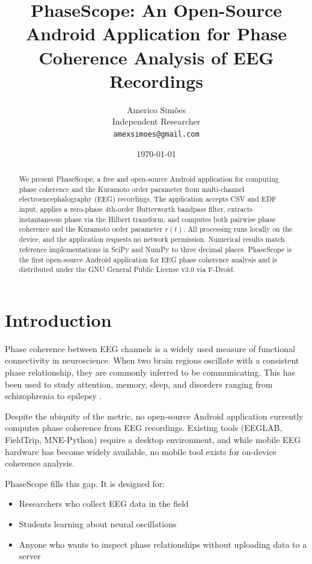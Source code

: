 \documentclass[11pt,a4paper]{article}
\title{\textbf{PhaseScope: An Open-Source Android Application for Phase Coherence Analysis of EEG Recordings}}
\author{Americo Sim\~oes\\ \small Independent Researcher\\ \small \texttt{amexsimoes@gmail.com}}
\date{\today}
\begin{document}
\maketitle

\begin{abstract}
We present PhaseScope, a free and open-source Android application for computing phase coherence and the Kuramoto order parameter from multi-channel electroencephalography (EEG) recordings. The application accepts CSV and EDF input, applies a zero-phase 4th-order Butterworth bandpass filter, extracts instantaneous phase via the Hilbert transform, and computes both pairwise phase coherence and the Kuramoto order parameter $r(t)$. All processing runs locally on the device, and the application requests no network permission. Numerical results match reference implementations in SciPy and NumPy to three decimal places. PhaseScope is the first open-source Android application for EEG phase coherence analysis and is distributed under the GNU General Public License v3.0 via F-Droid.
\end{abstract}

\section{Introduction}

Phase coherence between EEG channels is a widely used measure of functional connectivity in neuroscience. When two brain regions oscillate with a consistent phase relationship, they are commonly inferred to be communicating. This has been used to study attention, memory, sleep, and disorders ranging from schizophrenia to epilepsy \cite{fries2015,engel2001}.

Despite the ubiquity of the metric, no open-source Android application currently computes phase coherence from EEG recordings. Existing tools (EEGLAB, FieldTrip, MNE-Python) require a desktop environment, and while mobile EEG hardware has become widely available, no mobile tool exists for on-device coherence analysis.

PhaseScope fills this gap. It is designed for:
\begin{itemize}
\item Researchers who collect EEG data in the field
\item Students learning about neural oscillations
\item Anyone who wants to inspect phase relationships without uploading data to a server
\end{itemize}
\end{document}
